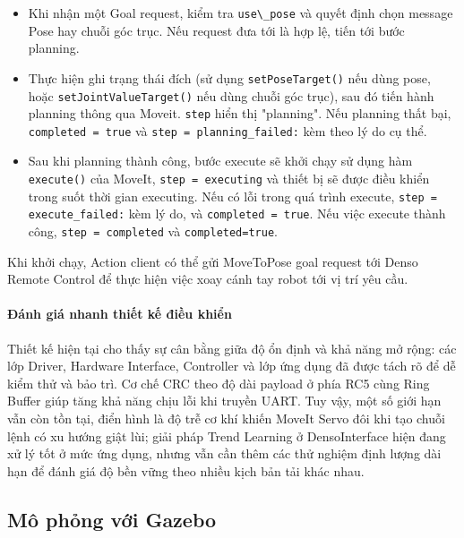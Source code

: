 \begin{itemize}
    \item Khi nhận một Goal request, kiểm tra \lstinline[style=inlinecode]{use\_pose} và quyết định chọn message Pose hay chuỗi góc trục. Nếu request đưa tới là hợp lệ, tiến tới bước planning.
    \item Thực hiện ghi trạng thái đích (sử dụng \lstinline[style=inlinecode]{setPoseTarget()} nếu dùng pose, hoặc \lstinline[style=inlinecode]{setJointValueTarget()} nếu dùng chuỗi góc trục), sau đó tiến hành planning thông qua Moveit. \lstinline[style=inlinecode]{step} hiển thị "planning". Nếu planning thất bại, \lstinline[style=inlinecode]{completed = true} và \lstinline[style=inlinecode]{step = planning_failed:} kèm theo lý do cụ thể.
    \item Sau khi planning thành công, bước execute sẽ khởi chạy sử dụng hàm \lstinline[style=inlinecode]{execute()} của MoveIt, \lstinline[style=inlinecode]{step = executing} và thiết bị sẽ được điều khiển trong suốt thời gian executing. Nếu có lỗi trong quá trình execute, \lstinline[style=inlinecode]{step = execute_failed:} kèm lý do, và \lstinline[style=inlinecode]{completed = true}. Nếu việc execute thành công, \lstinline[style=inlinecode]{step = completed} và \lstinline[style=inlinecode]{completed=true}.
\end{itemize}

Khi khởi chạy, Action client có thể gửi MoveToPose goal request tới Denso Remote Control để thực hiện việc xoay cánh tay robot tới vị trí yêu cầu.

\paragraph{Đánh giá nhanh thiết kế điều khiển}

Thiết kế hiện tại cho thấy sự cân bằng giữa độ ổn định và khả năng mở rộng: các lớp Driver, Hardware Interface, Controller và lớp ứng dụng đã được tách rõ để dễ kiểm thử và bảo trì. Cơ chế CRC theo độ dài payload ở phía RC5 cùng Ring Buffer giúp tăng khả năng chịu lỗi khi truyền UART. Tuy vậy, một số giới hạn vẫn còn tồn tại, điển hình là độ trễ cơ khí khiến MoveIt Servo đôi khi tạo chuỗi lệnh có xu hướng giật lùi; giải pháp Trend Learning ở DensoInterface hiện đang xử lý tốt ở mức ứng dụng, nhưng vẫn cần thêm các thử nghiệm định lượng dài hạn để đánh giá độ bền vững theo nhiều kịch bản tải khác nhau.

\subsection{Mô phỏng với Gazebo}

